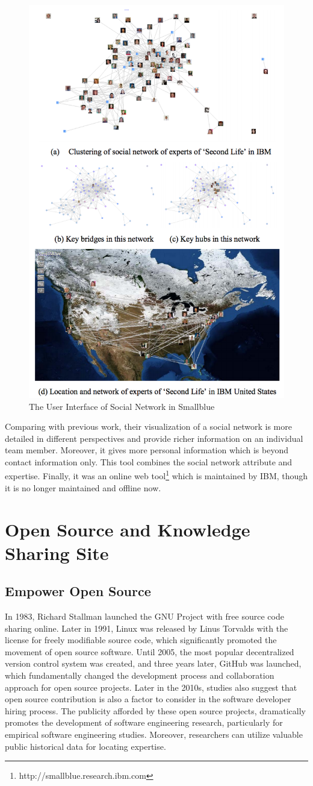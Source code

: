 \begin{figure}
\includegraphics[width = 0.6\columnwidth]{smallblue.png}
\centering
\caption{The User Interface of Social Network in Smallblue \cite{lin2009smallblue}}
\label{Smallblue}
\end{figure}

Comparing with previous work, their visualization of a social network is more detailed in different perspectives and provide richer information on an individual team member. Moreover, it gives more personal information which is beyond contact information only. This tool combines the social network attribute and expertise. Finally, it was an online web tool\footnote{http://smallblue.research.ibm.com} which is maintained by IBM, though it is no longer maintained and offline now.

\section{Open Source and Knowledge Sharing Site}

\subsection{Empower Open Source}

In 1983, Richard Stallman launched the GNU Project with free source code sharing online. Later in 1991, Linux was released by Linus Torvalds with the license for freely modifiable source code, which significantly promoted the movement of open source software. Until 2005, the most popular decentralized version control system was created, and three years later, GitHub was launched, which fundamentally changed the development process and collaboration approach for open source projects. Later in the 2010s, studies also suggest that open source contribution is also a factor to consider in the software developer hiring process. The publicity afforded by these open source projects, dramatically promotes the development of software engineering research, particularly for empirical software engineering studies. Moreover, researchers can utilize valuable public historical data for locating expertise. 

